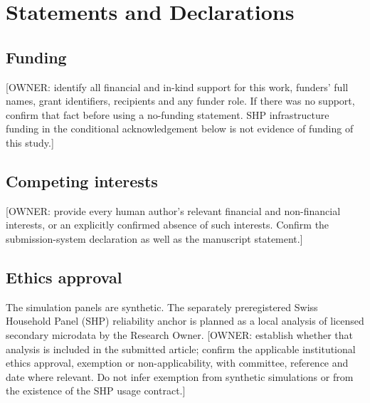 %

\section*{Statements and Declarations}

\subsection*{Funding}
[OWNER: identify all financial and in-kind support for this work, funders' full
names, grant identifiers, recipients and any funder role. If there was no support,
confirm that fact before using a no-funding statement. SHP infrastructure funding
in the conditional acknowledgement below is not evidence of funding of this study.]

\subsection*{Competing interests}
[OWNER: provide every human author's relevant financial and non-financial
interests, or an explicitly confirmed absence of such interests. Confirm the
submission-system declaration as well as the manuscript statement.]

\subsection*{Ethics approval}
The simulation panels are synthetic. The separately preregistered Swiss Household
Panel (SHP) reliability anchor is planned as a local analysis of licensed
secondary microdata by the Research Owner.
[OWNER: establish whether that analysis is included in the submitted article;
confirm the applicable institutional ethics approval, exemption or non-applicability,
with committee, reference and date where relevant. Do not infer exemption from
synthetic simulations or from the existence of the SHP usage contract.]


